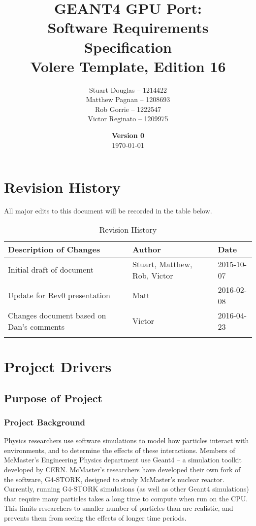 \documentclass[12pt]{article}
\title{
\LARGE GEANT4 GPU Port:
\\\vspace{10mm}
\large \textbf{Software Requirements Specification}
\\Volere Template, Edition 16
\vspace{40mm}
}
\author{
Stuart Douglas -- 1214422
\\Matthew Pagnan -- 1208693
\\Rob Gorrie -- 1222547
\\Victor Reginato -- 1209975
\vspace{10mm}
}
\date{\vfill \textbf{Version 0}\\ \today}
\begin{document}

\maketitle
\newpage

\tableofcontents
\newpage
{}
\restoregeometry

\section{Revision History}
All major edits to this document will be recorded in the table below.

\begin{table}[h]
\centering
\caption{Revision History}
\begin{tabular}{|l|l|l|}
\Xhline{2\arrayrulewidth}
\bf Description of Changes & \bf Author & \bf Date\\\hline
Initial draft of document & Stuart, Matthew, Rob, Victor & 2015-10-07\\
Update for Rev0 presentation & Matt & 2016-02-08\\
Changes document based on Dan's comments & Victor & 2016-04-23\\
\Xhline{2\arrayrulewidth}
\end{tabular}
\end{table}

\section{Project Drivers}

\subsection{Purpose of Project} %
\subsubsection{Project Background}
Physics researchers use software simulations to model how particles interact with environments, and to determine the effects of these interactions. Members of McMaster's Engineering Physics department use Geant4 -- a simulation toolkit developed by CERN. McMaster's researchers have developed their own fork of the software, G4-STORK, designed to study McMaster's nuclear reactor. Currently, running G4-STORK simulations (as well as other Geant4 simulations) that require many particles takes a long time to compute when run on the CPU. This limits researchers to smaller number of particles than are realistic, and prevents them from seeing the effects of longer time periods.
\end{document}
